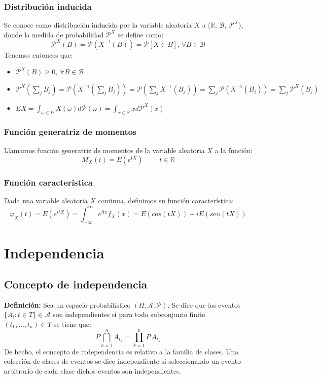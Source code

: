 \subsubsection{Distribución inducida}
Se conoce como distribución inducida por la variable aleatoria $X$ a ($\mathbb{R}$, $\mathcal{B}$, $\mathcal{P}^X$), donde la medida de probabilidad $\mathcal{P}^X$ se define como:
$$ \mathcal{P}^X(B) = \mathcal{P}(X^{-1}(B)) = \mathcal{P}[X\in B], \, \forall B \in \mathcal{B} $$
Tenemos entonces que:
\begin{itemize}
\item $\mathcal{P}^X(B) \geq 0,\  \forall B \in \mathcal{B}$
\item $\displaystyle \mathcal{P}^X(\sum_j B_j) = \mathcal{P}(X^{-1}(\sum_jB_j)) = \mathcal{P}(\sum_j X^{-1}(B_j)) = \sum_j \mathcal{P}(X^{-1}(B_j)) = \sum_j \mathcal{P}^X(B_j)$
\item $\displaystyle EX = \int_{\omega \in \Omega} X(\omega) d \mathcal{P(\omega)} = \int_{x \in \mathbb{R}} x d\mathcal{P}^X(x)$
\end{itemize}

\subsubsection{Función generatriz de momentos}
Llamamos función generatriz de momentos de la variable aleatoria $X$ a la función:
$$ M_X(t) = E(e^{tX}) \hspace{1cm} t \in \mathbb{R} $$
\subsubsection{Función característica}
Dada una variable aleatoria $X$ continua, definimos su función característica:
$$\varphi_X(t)=E(e^{itX})=\int_{-\infty}^{\infty}e^{itx}f_{X}(x)=E(cos(tX))+iE(sen(tX))$$

\section{Independencia}
\subsection{Concepto de independencia}
\textbf{Definición: }Sea un espacio probabilístico $(\Omega,\mathcal{A},\mathcal{P})$. Se dice que los eventos $\{A_t : t\in T \}\in \mathcal{A}$ son independientes si para todo subconjunto finito $(t_1,\ldots ,t_n)\in T$ se tiene que:
$$P\bigcap_{k=1}^n A_{t_k}=\displaystyle\prod_{k=1}^{n}P\, A_{t_k}$$
De hecho, el concepto de independencia es relativo a la familia de clases. Una colección de clases de eventos se dice independiente si seleccionando un evento arbitrario de cada clase dichos eventos son independientes. 

